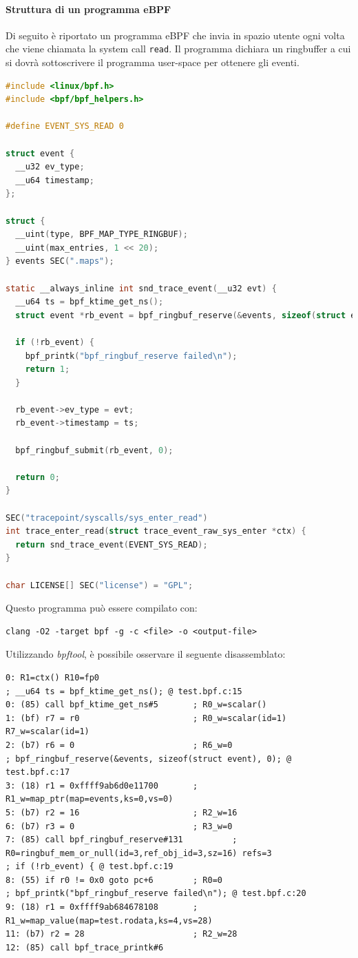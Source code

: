 \documentclass{article}
\begin{document}
\paragraph{Struttura di un programma eBPF} Di seguito è riportato un programma eBPF che invia in spazio utente ogni volta che viene chiamata la system call \texttt{read}. Il programma dichiara un ringbuffer a cui si dovrà sottoscrivere il programma user-space per ottenere gli eventi.
\begin{lstlisting}[language=C, caption={Esempio di un programma eBPF che invia in user-space tutte le operazioni sys\_enter\_read}]
#include <linux/bpf.h>
#include <bpf/bpf_helpers.h>

#define EVENT_SYS_READ 0

struct event {
  __u32 ev_type;
  __u64 timestamp;
};

struct {
  __uint(type, BPF_MAP_TYPE_RINGBUF);
  __uint(max_entries, 1 << 20);
} events SEC(".maps");

static __always_inline int snd_trace_event(__u32 evt) {
  __u64 ts = bpf_ktime_get_ns();
  struct event *rb_event = bpf_ringbuf_reserve(&events, sizeof(struct event), 0);

  if (!rb_event) {
    bpf_printk("bpf_ringbuf_reserve failed\n");
    return 1;
  }

  rb_event->ev_type = evt;
  rb_event->timestamp = ts;

  bpf_ringbuf_submit(rb_event, 0);

  return 0;
}

SEC("tracepoint/syscalls/sys_enter_read")
int trace_enter_read(struct trace_event_raw_sys_enter *ctx) {
  return snd_trace_event(EVENT_SYS_READ); 
}

char LICENSE[] SEC("license") = "GPL";
\end{lstlisting}

Questo programma può essere compilato con:
\begin{verbatim}
clang -O2 -target bpf -g -c <file> -o <output-file>
\end{verbatim}

Utilizzando \textit{bpftool}, è possibile osservare il seguente disassemblato:
\begin{verbatim}
0: R1=ctx() R10=fp0
; __u64 ts = bpf_ktime_get_ns(); @ test.bpf.c:15
0: (85) call bpf_ktime_get_ns#5       ; R0_w=scalar()
1: (bf) r7 = r0                       ; R0_w=scalar(id=1) R7_w=scalar(id=1)
2: (b7) r6 = 0                        ; R6_w=0
; bpf_ringbuf_reserve(&events, sizeof(struct event), 0); @ test.bpf.c:17
3: (18) r1 = 0xffff9ab6d0e11700       ; R1_w=map_ptr(map=events,ks=0,vs=0)
5: (b7) r2 = 16                       ; R2_w=16
6: (b7) r3 = 0                        ; R3_w=0
7: (85) call bpf_ringbuf_reserve#131          ; R0=ringbuf_mem_or_null(id=3,ref_obj_id=3,sz=16) refs=3
; if (!rb_event) { @ test.bpf.c:19
8: (55) if r0 != 0x0 goto pc+6        ; R0=0
; bpf_printk("bpf_ringbuf_reserve failed\n"); @ test.bpf.c:20
9: (18) r1 = 0xffff9ab684678108       ; R1_w=map_value(map=test.rodata,ks=4,vs=28)
11: (b7) r2 = 28                      ; R2_w=28
12: (85) call bpf_trace_printk#6
\end{verbatim}
\end{document}
